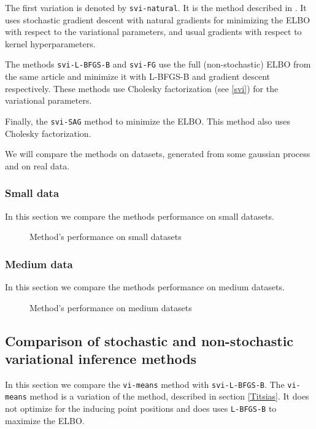 \documentclass[12pt]{article}
\begin{document}
		The first variation is denoted by \lstinline{svi-natural}. It is the method described in \cite{BigData}. It uses stochastic gradient descent with natural gradients for minimizing the ELBO with respect to the variational parameters, and usual gradients with respect to kernel hyperparameters.

		The methods \lstinline{svi-L-BFGS-B} and \lstinline{svi-FG} use the full (non-stochastic) ELBO from the same article \cite{BigData} and minimize it with L-BFGS-B and gradient descent respectively. These methods use Cholesky factorization (see \ref{svi}) for the variational parameters.

		Finally, the \lstinline{svi-SAG} method to minimize the ELBO. This method also uses Cholesky factorization.

		We will compare the methods on datasets, generated from some gaussian process and on real data.

		\subsubsection{Small data}
			In this section we compare the methods performance on small datasets.

		\begin{figure}[!h]
			\centering
			\subfloat{
				\scalebox{0.9}{
					
				}
			}
			\subfloat{
				\scalebox{0.9}{
		    		
				}
			}
			\caption{Method's performance on small datasets}
			\label{hfn}
		\end{figure}

		\subsubsection{Medium data}
			In this section we compare the methods performance on medium datasets.

		\begin{figure}[!h]
			\centering
			\subfloat{
				\scalebox{0.9}{
					
				}
			}
			\subfloat{
				\scalebox{0.9}{
		    		
				}
			}
			\caption{Method's performance on medium datasets}
		\end{figure}

\subsection{Comparison of stochastic and non-stochastic variational inference methods}
	In this section we compare the \lstinline{vi-means} method with \lstinline{svi-L-BFGS-B}. The \lstinline{vi-means} method is a variation of the method, described in section \ref{Titsias}. It does not optimize for the inducing point positions and does uses \lstinline{L-BFGS-B} to maximize the ELBO.
\end{document}
